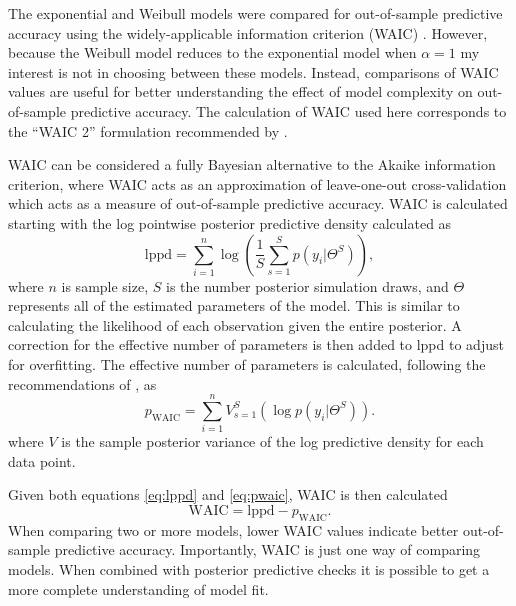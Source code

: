 \documentclass[12pt,letterpaper]{article}
\begin{document}
The exponential and Weibull models were compared for out-of-sample predictive accuracy using the widely-applicable information criterion (WAIC) \citep{Watanabe2010a}. However, because the Weibull model reduces to the exponential model when \(\alpha = 1\) my interest is not in choosing between these models. Instead, comparisons of WAIC values are useful for better understanding the effect of model complexity on out-of-sample predictive accuracy. The calculation of WAIC used here corresponds to the ``WAIC 2'' formulation recommended by \citet{Gelman2013d}.

WAIC can be considered a fully Bayesian alternative to the Akaike information criterion, where WAIC acts as an approximation of leave-one-out cross-validation which acts as a measure of out-of-sample predictive accuracy. WAIC is calculated starting with the log pointwise posterior predictive density calculated as
\begin{equation}
  \mathrm{lppd} = \sum_{i = 1}^{n} \log \left(\frac{1}{S} \sum_{s = 1}^{S} p(y_{i}|\Theta^{S})\right),
  \label{eq:lppd}
\end{equation}
where \(n\) is sample size, \(S\) is the number posterior simulation draws, and \(\Theta\) represents all of the estimated parameters of the model. This is similar to calculating the likelihood of each observation given the entire posterior. A correction for the effective number of parameters is then added to lppd to adjust for overfitting. The effective number of parameters is calculated, following the recommendations of \citet{Gelman2013d}, as
\begin{equation}
  p_{\mathrm{WAIC}} = \sum_{i = 1}^{n} V_{s = 1}^{S} (\log p(y_{i}|\Theta^{S})).
  \label{eq:pwaic}
\end{equation}
where \(V\) is the sample posterior variance of the log predictive density for each data point.

Given both equations \ref{eq:lppd} and \ref{eq:pwaic}, WAIC is then calculated
\begin{equation}
  \mathrm{WAIC} = \mathrm{lppd} - p_{\mathrm{WAIC}}.
  \label{eq:waic}
\end{equation}
When comparing two or more models, lower WAIC values indicate better out-of-sample predictive accuracy. Importantly, WAIC is just one way of comparing models. When combined with posterior predictive checks it is possible to get a more complete understanding of model fit.
\end{document}

